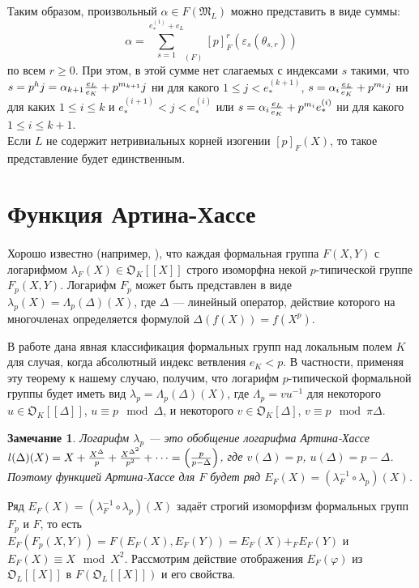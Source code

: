 \documentclass[a4paper]{article}
\newcommand{\ML}{\mathfrak{M}_L}
\newcommand{\OK}{\mathfrak{O}_K}
\newcommand{\OL}{\mathfrak{O}_L}
\newcommand{\Leq}{\leqslant}
\newcommand{\Geq}{\geqslant}
\newtheorem{note}{Замечание}
\begin{document}
Таким образом, произвольный $\alpha \in F(\ML)$ можно представить в виде суммы: 
$$\alpha = {\sum\limits_{s=1}^{e_*^{(1)} + e_L}}_{(F)}[p]_F^r(\varepsilon_s(\theta_{s,r}))$$
по всем $r \Geq 0$. При этом, в этой сумме нет слагаемых с индексами $s$ такими, что $s = p^hj=\alpha_{k+1}{e_L \over e_K} + p^{m_{k+1}}j$ ни для какого $1 \Leq j < e_*^{(k+1)}$, $s = \alpha_i{e_L \over e_K}+p^{m_i}j$ ни для каких $1\Leq i\Leq k$ и $e_*^{(i+1)} < j < e_*^{(i)}$ или $s = \alpha_i{e_L \over e_K} + p^{m_i}e_*^{(i)}$ ни для какого $1\Leq i\Leq k+1$.\\
Если $L$ не содержит нетривиальных корней изогении $[p]_F(X)$, то такое представление будет единственным.


\section{Функция Артина-Хассе}
\paragraph{}

Хорошо известно (например, \cite[\S 1.1]{GroupsClassification}), что каждая формальная группа $F(X,Y)$ с логарифмом $\lambda_F(X) \in \OK[[X]]$ строго изоморфна некой $p$-типической группе $F_p(X,Y)$. Логарифм $F_p$ может быть представлен в виде $\lambda_p(X)=\Lambda_p(\Delta)(X)$, где $\Delta$ --- линейный оператор, действие которого на многочленах определяется формулой $\Delta(f(X)) = f(X^p)$.

В работе \cite[Теорема 6.3.1]{GroupsClassification} дана явная классификация формальных групп над локальным полем $K$ для случая, когда абсолютный индекс ветвления $e_K < p$. В частности, применяя эту теорему к нашему случаю, получим, что логарифм $p$-типической формальной группы будет иметь вид $\lambda_p=\Lambda_p(\Delta)(X)$, где $\Lambda_p = vu^{-1}$ для некоторого $u\in \OK[[\Delta]]$, $u \equiv p \mod \Delta$, и некоторого $v \in \OK[\Delta]$, $v \equiv p \mod \pi\Delta$.\\

\begin{note}
	Логарифм $\lambda_p$ --- это обобщение логарифма Артина-Хассе $l(\Delta)(X)=X+{X^\Delta\over p}+{X^{\Delta^2}\over p^2}+\dots = \left(p \over {p-\Delta}\right)$, где $v(\Delta) = p$, $u(\Delta) = p-\Delta$. Поэтому функцией Артина-Хассе для $F$ будет ряд $E_F(X) = (\lambda_F^{-1}\circ\lambda_p)(X)$.
\end{note}

Ряд $E_F(X)=(\lambda_F^{-1}\circ\lambda_{p})(X)$ задаёт строгий изоморфизм формальных групп $F_p$ и $F$, то есть $E_F(F_{p}(X,Y)) = F(E_F(X),E_F(Y)) = E_F(X) +_F E_F(Y)$ и $E_F(X) \equiv X \mod X^2$.
Рассмотрим действие отображения $E_F(\varphi)$ из $\OL[[X]]$ в $F(\OL[[X]])$ и его свойства.
\end{document}
